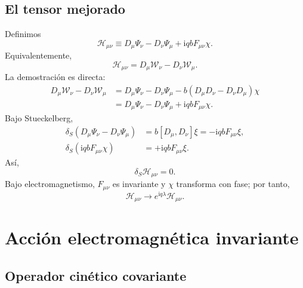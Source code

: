 \documentclass[11pt,a4paper]{article}
\numberwithin{equation}{section}
\newcommand{\Wcal}{\mathcal W}
\newcommand{\Hcal}{\mathcal H}
\newcommand{\ii}{\mathrm i}
\begin{document}
\subsection{El tensor mejorado}
\label{subsec:el-tensor-mejorado}

Definimos
\begin{equation}
\label{eq:Hcal-def}
\boxed{
\Hcal_{\mu\nu}
\equiv
D_\mu\Psi_\nu-D_\nu\Psi_\mu+
\ii q b F_{\mu\nu}\chi .}
\end{equation}
Equivalentemente,
\begin{equation}
\Hcal_{\mu\nu}=D_\mu\Wcal_\nu-D_\nu\Wcal_\mu.
\end{equation}
La demostración es directa:
\begin{align}
D_\mu\Wcal_\nu-D_\nu\Wcal_\mu
&=D_\mu\Psi_\nu-D_\nu\Psi_\mu
-b(D_\mu D_\nu-D_\nu D_\mu)\chi
\\
&=D_\mu\Psi_\nu-D_\nu\Psi_\mu
+\ii q bF_{\mu\nu}\chi.
\end{align}
Bajo Stueckelberg,
\begin{align}
\delta_S(D_\mu\Psi_\nu-D_\nu\Psi_\mu)
&=b[D_\mu,D_\nu]\xi
=-\ii q bF_{\mu\nu}\xi,\\
\delta_S(\ii q bF_{\mu\nu}\chi)
&=+\ii q bF_{\mu\nu}\xi.
\end{align}
Así,
\begin{equation}
\boxed{\delta_S\Hcal_{\mu\nu}=0.}
\end{equation}
Bajo electromagnetismo, $F_{\mu\nu}$ es invariante y $\chi$ transforma con fase; por tanto,
\begin{equation}
\Hcal_{\mu\nu}\to e^{\ii q\lambda}\Hcal_{\mu\nu}.
\end{equation}

\section{Acción electromagnética invariante}
\label{sec:accion-electromagnetica-invariante}

\subsection{Operador cinético covariante}
\label{subsec:operador-cinetico-covariante}
\end{document}
